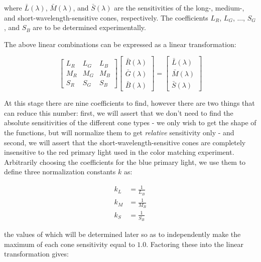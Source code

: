 \documentclass{article}
\begin{document}
\begin{multicols}{2}
where $\bar{L}(\lambda)$, $\bar{M}(\lambda)$, and $\bar{S}(\lambda)$ are the sensitivities of the long-, medium-, and short-wavelength-sensitive cones, respectively.  The coefficients $L_R$, $L_G$, ..., $S_G$, and $S_B$ are to be determined experimentally.

The above linear combinations can be expressed as a linear transformation:

\begin{equation} %
    \begin{bmatrix}
        L_R&L_G&L_B\\
        M_R&M_G&M_B\\
        S_R&S_G&S_B
    \end{bmatrix}\begin{bmatrix}
        \bar{R}(\lambda)\\
        \bar{G}(\lambda)\\
        \bar{B}(\lambda)
    \end{bmatrix}=\begin{bmatrix}
        \bar{L}(\lambda)\\
        \bar{M}(\lambda)\\
        \bar{S}(\lambda)
    \end{bmatrix}
\end{equation}

At this stage there are nine coefficients to find, however there are two things that can reduce this number: first, we will assert that we don't need to find the absolute sensitivities of the different cone types - we only wish to get the shape of the functions, but will normalize them to get \textit{relative} sensitivity only - and second, we will assert that the short-wavelength-sensitive cones are completely insensitive to the red primary light used in the color matching experiment.  Arbitrarily choosing the coefficients for the blue primary light, we use them to define three normalization constants $k$ as:

\begin{equation}\label{eq:cone_fundamental_normalization_constants_symbolic} %
    \begin{aligned}
        k_L&=\frac{1}{L_B}\\
        k_M&=\frac{1}{M_B}\\
        k_S&=\frac{1}{S_B}
    \end{aligned}
\end{equation}

the values of which will be determined later so as to independently make the maximum of each cone sensitivity equal to $1.0$.  Factoring these into the linear transformation gives:


\end{multicols}
\end{document}
